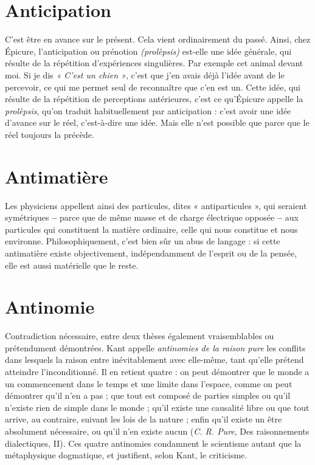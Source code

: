 \section{Anticipation}
C'est être en avance sur le présent. Cela vient ordinairement
du passé. Ainsi, chez Épicure, l’anticipation ou prénotion
{\it (prolèpsis)} est-elle une idée générale, qui résulte de la répétition d’expériences
singulières. Par exemple cet animal devant moi. Si je dis {\it « C'est un chien »},
c'est que j'en avais déjà l’idée avant de le percevoir, ce qui me permet seul de
reconnaître que c’en est un. Cette idée, qui résulte de la répétition de perceptions
antérieures, c’est ce qu'Épicure appelle la {\it prolèpsis}, qu’on traduit habituellement
par anticipation : c’est avoir une idée d’avance sur le réel, c’est-à-dire une idée.
Mais elle n’est possible que parce que le réel toujours la précède.

\section{Antimatière}
Les physiciens appellent ainsi des particules, dites « antiparticules »,
qui seraient symétriques {\bf --} parce que de même
masse et de charge électrique opposée {\bf --} aux particules qui constituent la
matière ordinaire, celle qui nous constitue et nous environne. Philosophiquement,
c’est bien sûr un abus de langage : si cette antimatière existe objectivement,
indépendamment de l'esprit ou de la pensée, elle est aussi matérielle que
le reste.

\section{Antinomie}
Contradiction nécessaire, entre deux thèses également vraisemblables
ou prétendument démontrées. Kant appelle {\it antinomies
de la raison pure} les conflits dans lesquels la raison entre inévitablement
avec elle-même, tant qu’elle prétend atteindre l’inconditionné. Il en retient
quatre : on peut démontrer que le monde a un commencement dans le temps
et une limite dans l’espace, comme on peut démontrer qu’il n’en a pas ; que
tout est composé de parties simples ou qu’il n’existe rien de simple dans le
monde ; qu’il existe une causalité libre ou que tout arrive, au contraire, suivant
les lois de la nature ; enfin qu’il existe un être absolument nécessaire, ou qu’il
n’en existe aucun ({\it C. R. Pure}, Des raisonnements dialectiques, II). Ces quatre
antinomies condamnent le scientisme autant que la métaphysique dogmatique,
et justifient, selon Kant, le criticisme.


